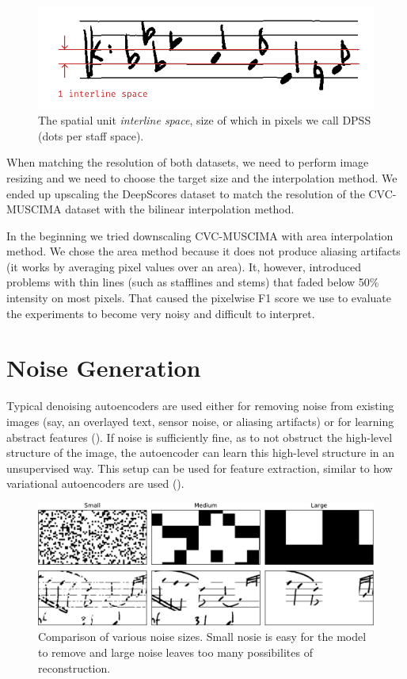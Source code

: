 \begin{figure}[ht]
    \centering
    \includegraphics[width=140mm]{../img/dpss-definition.pdf}
    \caption{The spatial unit \emph{interline space}, size of which in pixels we call DPSS (dots per staff space).}
    \label{fig:DpssDefinition}
\end{figure}

When matching the resolution of both datasets, we need to perform image resizing and we need to choose the target size and the interpolation method. We ended up upscaling the DeepScores dataset to match the resolution of the CVC-MUSCIMA dataset with the bilinear interpolation method.

In the beginning we tried downscaling CVC-MUSCIMA with area interpolation method. We chose the area method because it does not produce aliasing artifacts (it works by averaging pixel values over an area). It, however, introduced problems with thin lines (such as stafflines and stems) that faded below 50\% intensity on most pixels. That caused the pixelwise F1 score we use to evaluate the experiments to become very noisy and difficult to interpret.


\section{Noise Generation}
\label{sec:NoiseGeneration}

Typical denoising autoencoders are used either for removing noise from existing images (say, an overlayed text, sensor noise, or aliasing artifacts) or for learning abstract features (\cite{StackedDenoisingAutoencoders}). If noise is sufficiently fine, as to not obstruct the high-level structure of the image, the autoencoder can learn this high-level structure in an unsupervised way. This setup can be used for feature extraction, similar to how variational autoencoders are used (\cite{VariationalAutoencoder}).

\begin{figure}[ht]
    \centering
    \includegraphics[width=145mm]{../../figures/06-noise/noise-comparison.pdf}
    \caption{Comparison of various noise sizes. Small nosie is easy for the model to remove and large noise leaves too many possibilites of reconstruction.}
    \label{fig:NoiseComparison}
\end{figure}

